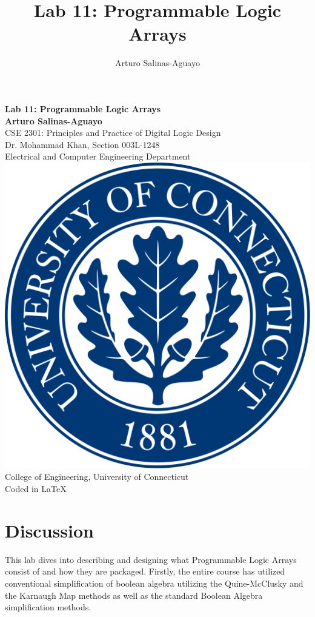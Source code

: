 \documentclass[12pt]{article}
\author{Arturo Salinas-Aguayo}
\title{Lab 11: Programmable Logic Arrays}
\begin{document}
\newcommand{\closure}[2][3]{%
	{}\mkern#1mu\overline{\mkern-#1mu#2}}
\newcommand\ncoverline[1]{\mkern1mu\overline{\mkern-1mu#1\mkern-1mu}\mkern1mu}
\begin{titlepage}
	\centering
	\vspace*{3cm}
	\huge\textbf{Lab 11: Programmable Logic Arrays}\\
	\vspace{5cm}
	\Large\textbf{Arturo Salinas-Aguayo}\\
	\normalsize
	CSE 2301: Principles and Practice of Digital Logic Design\\
	Dr. Mohammad Khan, Section 003L-1248\\
	Electrical and Computer Engineering Department
	\vfill
	\includegraphics[scale=0.1]{uconnlogo}\\
	College of Engineering, University of Connecticut\\
	\scriptsize{Coded in \LaTeX}
	\vspace*{1cm}
\end{titlepage}
\section*{Discussion}
This lab dives into describing and designing what Programmable Logic Arrays
consist of and how they are packaged. Firstly, the entire course has utilized
conventional simplification of boolean algebra utilizing the Quine-McClusky
and the Karnaugh Map methods as well as the standard Boolean Algebra
simplification methods.
\end{document}
